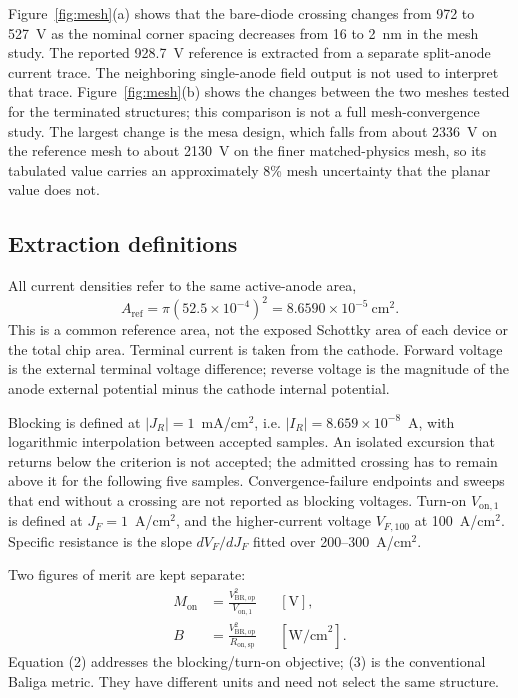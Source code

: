 \documentclass[journal,10pt]{IEEEtran}
\newcommand{\Von}{\ensuremath{V_{\mathrm{on},1}}}
\begin{document}
Figure~\ref{fig:mesh}(a) shows that the bare-diode crossing changes from 972 to 527~V as the nominal corner spacing decreases from 16 to 2~nm in the mesh study. The reported 928.7~V reference is extracted from a separate split-anode current trace. The neighboring single-anode field output is not used to interpret that trace. Figure~\ref{fig:mesh}(b) shows the changes between the two meshes tested for the terminated structures; this comparison is not a full mesh-convergence study. The largest change is the mesa design, which falls from about 2336~V on the reference mesh to about 2130~V on the finer matched-physics mesh, so its tabulated value carries an approximately 8\% mesh uncertainty that the planar value does not.

\subsection{Extraction definitions}
All current densities refer to the same active-anode area,
\begin{equation}
A_{\mathrm{ref}}=\pi(52.5\times10^{-4})^2=8.6590\times10^{-5}\ \mathrm{cm}^2 .
\end{equation}
This is a common reference area, not the exposed Schottky area of each device or the total chip area. Terminal current is taken from the cathode. Forward voltage is the external terminal voltage difference; reverse voltage is the magnitude of the anode external potential minus the cathode internal potential.

Blocking is defined at $|J_R|=1$~mA/cm$^2$, i.e. $|I_R|=8.659\times10^{-8}$~A, with logarithmic interpolation between accepted samples. An isolated excursion that returns below the criterion is not accepted; the admitted crossing has to remain above it for the following five samples. Convergence-failure endpoints and sweeps that end without a crossing are not reported as blocking voltages. Turn-on $\Von$ is defined at $J_F=1$~A/cm$^2$, and the higher-current voltage $V_{F,100}$ at 100~A/cm$^2$. Specific resistance is the slope $dV_F/dJ_F$ fitted over 200--300~A/cm$^2$.

Two figures of merit are kept separate:
\begin{align}
M_{\mathrm{on}}&=\frac{V_{\mathrm{BR,op}}^2}{V_{\mathrm{on},1}} &&[\mathrm{V}],\\
B&=\frac{V_{\mathrm{BR,op}}^2}{R_{\mathrm{on,sp}}} &&[\mathrm{W/cm}^2].
\end{align}
Equation (2) addresses the blocking/turn-on objective; (3) is the conventional Baliga metric. They have different units and need not select the same structure.
\end{document}
